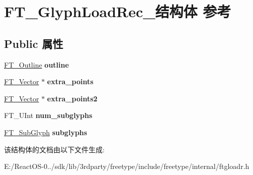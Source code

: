 \hypertarget{struct_f_t___glyph_load_rec__}{}\section{F\+T\+\_\+\+Glyph\+Load\+Rec\+\_\+结构体 参考}
\label{struct_f_t___glyph_load_rec__}
\subsection*{Public 属性}
\begin{DoxyCompactItemize}
\item 
\mbox{\label{struct_f_t___glyph_load_rec___ae340cdb5263322e86c640b15f82ea72a}} 
\hyperlink{struct_f_t___outline__}{F\+T\+\_\+\+Outline} {\bfseries outline}
\item 
\mbox{\label{struct_f_t___glyph_load_rec___ad2547bd6a7c7473d3a4646dfe908f1c3}} 
\hyperlink{struct_f_t___vector__}{F\+T\+\_\+\+Vector} $\ast$ {\bfseries extra\+\_\+points}
\item 
\mbox{\label{struct_f_t___glyph_load_rec___a5e8bbe62bd889e806700bc0d583ff79b}} 
\hyperlink{struct_f_t___vector__}{F\+T\+\_\+\+Vector} $\ast$ {\bfseries extra\+\_\+points2}
\item 
\mbox{\label{struct_f_t___glyph_load_rec___a71dc4ab52b956b974fe65c95a098e03c}} 
F\+T\+\_\+\+U\+Int {\bfseries num\+\_\+subglyphs}
\item 
\mbox{\label{struct_f_t___glyph_load_rec___a12ef145fedbeb14cc8b9d320ae3fed96}} 
\hyperlink{struct_f_t___sub_glyph_rec__}{F\+T\+\_\+\+Sub\+Glyph} {\bfseries subglyphs}
\end{DoxyCompactItemize}


该结构体的文档由以下文件生成\+:\begin{DoxyCompactItemize}
\item 
E\+:/\+React\+O\+S-\/0../sdk/lib/3rdparty/freetype/include/freetype/internal/ftgloadr.\+h\end{DoxyCompactItemize}
